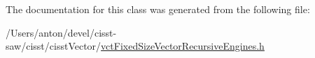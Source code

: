 The documentation for this class was generated from the following file\+:\begin{DoxyCompactItemize}
\item 
/\+Users/anton/devel/cisst-\/saw/cisst/cisst\+Vector/\hyperlink{vct_fixed_size_vector_recursive_engines_8h}{vct\+Fixed\+Size\+Vector\+Recursive\+Engines.\+h}\end{DoxyCompactItemize}

